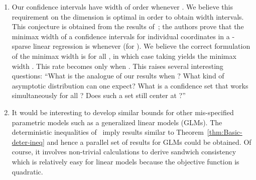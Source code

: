 \documentclass{article}
\begin{document}
\begin{enumerate}
\item Our confidence intervals have width of order   whenever  . We believe this requirement on the dimension is optimal in order to obtain   width intervals. This conjecture is obtained from the results of~\cite{cai2017confidence}; the authors prove that the minimax width of a confidence intervals for individual coordinates in a  -sparse linear regression is   whenever   (for  ). We believe the correct formulation of the minimax width is   for all  , in which case taking   yields the minimax width  . This rate becomes   only when  . This raises several interesting questions: ``What is the analogue of our results when  ? What kind of asymptotic distribution can one expect? What is a confidence set that works simultaneously for all  ? Does such a set still center at  ?''
\item It would be interesting to develop similar bounds for
other mis-specified parametric models such as a generalized linear
models (GLMs). The deterministic inequalities of~\cite{2018arXiv180905172K}
imply results similar to Theorem~\ref{thm:Basic-deter-ineq} and hence
a parallel set of results for GLMs could be obtained. Of course, it involves non-trivial calculations to derive sandwich consistency which is
relatively easy for linear models because the objective function is quadratic.
\end{enumerate}
\newpage
\end{document}
